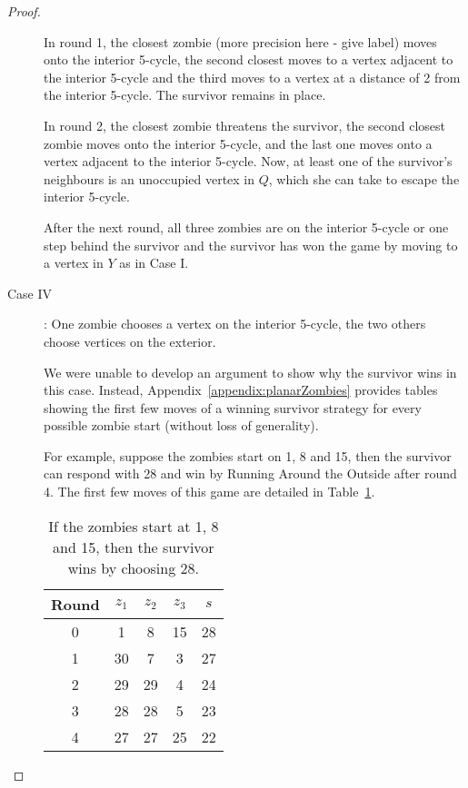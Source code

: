 \begin{proof}
\begin{description}
In round 1, the closest zombie (more precision here - give label) moves onto the interior 5-cycle, the second closest moves to a vertex adjacent to the interior 5-cycle and the third
moves to a vertex at a distance of 2 from the interior 5-cycle. The survivor remains in place.

In round 2, the closest zombie threatens the survivor, the second closest zombie moves onto the interior 5-cycle, and the last one moves onto a vertex adjacent to the
interior 5-cycle. Now, at least one of the survivor's neighbours is an unoccupied vertex in $Q$, which she can take to escape the interior 5-cycle.

After the next round, all three zombies are on the interior 5-cycle or one step behind the survivor and the survivor has won the game by moving to a vertex in $Y$
as in Case I.

\item[Case IV\label{planar case 4}]: One zombie chooses a vertex on the interior 5-cycle, the two others choose vertices on the exterior.

We were unable to develop an argument to show why the survivor wins in this case.
Instead, Appendix~\ref{appendix:planarZombies} provides tables showing the first few moves of a winning survivor strategy
for every possible zombie start (without loss of generality).

For example, suppose the zombies start on 1, 8 and 15, then the survivor can respond with 28 and win by Running Around the Outside after round 4. The first few moves of this game are detailed in Table~\ref{table start 1 8 15}.
\begin{table}
\begin{tabular}{c | c | c | c | c }
Round & $z_1$ & $z_2$ & $z_3$ & $s$ \\
\hline
0 & 1 & 8 & 15 & 28 \\
1 & 30 & 7 & 3 & 27 \\
2 & 29 & 29 & 4 & 24 \\
3 & 28 & 28 & 5 & 23 \\
4 & 27 & 27 & 25 & 22 \\
\end{tabular}
\caption{If the zombies start at 1, 8 and 15, then the survivor wins by choosing 28. \label{table start 1 8 15}}
\end{table}

\end{description}
\end{proof}

